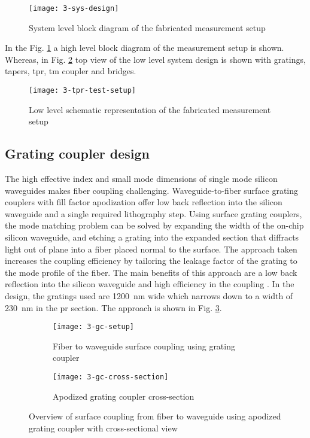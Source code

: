 \documentclass[../report.tex]{subfiles}
\begin{document}
\begin{figure}[H] %
	\centering
	\texttt{[image: 3-sys-design]}
	\caption{System level block diagram of the fabricated measurement setup}
	\label{fig:3_sys_design}
\end{figure}
\noindent In the Fig. \ref{fig:3_sys_design} a high level block diagram of the measurement setup is shown. Whereas, in Fig. \ref{fig:3_tpr_test_setup} top view of the low level system design is shown with gratings, tapers, \gls{tpr}, \gls{tm} coupler and bridges. 
\begin{figure}[H] %
	\centering
	\texttt{[image: 3-tpr-test-setup]}
	\caption{Low level schematic representation of the fabricated measurement setup}
	\label{fig:3_tpr_test_setup}
\end{figure}

\subsection{Grating coupler design}
The high effective index and small mode dimensions of single mode silicon waveguides makes fiber coupling challenging. Waveguide-to-fiber surface grating couplers with fill factor apodization offer low back reflection into the silicon waveguide and a single required lithography step. Using surface grating couplers, the mode matching problem can be solved by expanding the width of the on-chip silicon waveguide, and etching a grating into the expanded section that diffracts light out of plane into a fiber placed normal to the surface. The approach taken increases the coupling efficiency by tailoring the leakage factor of the grating to the mode profile of the fiber. The main benefits of this approach are a low back reflection into the silicon waveguide and high efficiency in the coupling \cite{grating_coupler}. In the design, the gratings used are \SI{1200}{\nano\meter} wide which narrows down to a width of \SI{230}{\nano\meter} in the \gls{pr} section. The approach is shown in Fig. \ref{fig:3_gc_setup}.

\begin{figure}[H] %
	\begin{subfigure}[t]{0.45\textwidth}
		\texttt{[image: 3-gc-setup]}
		\caption{Fiber to waveguide surface coupling using grating coupler}
		\label{fig:3_gc_setup}
	\end{subfigure}
	\hfill
	\begin{subfigure}[t]{0.45\textwidth}
		\texttt{[image: 3-gc-cross-section]}
		\caption{Apodized grating coupler cross-section}
		\label{fig:3_gc_cross_section}
	\end{subfigure}
	\caption{Overview of surface coupling from fiber to waveguide using apodized grating coupler with cross-sectional view}
\end{figure}
\end{document}

